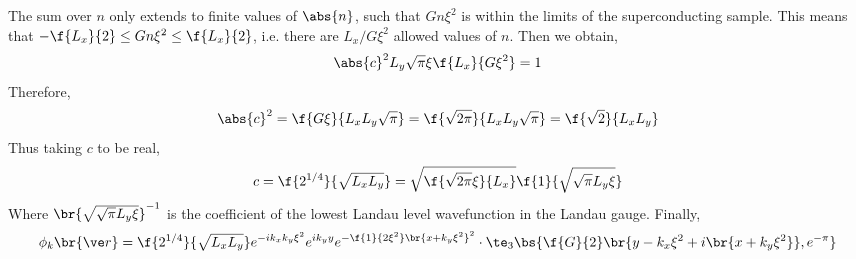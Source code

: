 \documentclass{article}
\begin{document}
The sum over $n$ only extends to finite values of $\abs{n}$, such that $Gn \xi^2$ is within the limits of the superconducting sample. This means that $- \f{L_x}{2} \leq G n \xi^2 \leq \f{L_x}{2}$, i.e. there are $L_x / G \xi^2$ allowed values of $n$. Then we obtain,
\[ \abs{c}^2 L_y \sqrt{\pi} \xi \f{L_x}{G \xi^2} = 1 \]
Therefore,
\[ \abs{c}^2 = \f{G \xi}{L_xL_y \sqrt{\pi}} = \f{\sqrt{2\pi}}{L_xL_y \sqrt{\pi}} = \f{\sqrt{2}}{L_x L_y} \]
Thus taking $c$ to be real,
\[  c = \f{2^{1/4}}{\sqrt{L_xL_y}} = \sqrt{\f{\sqrt{2\pi} \xi}{L_x}} \f{1}{\sqrt{\sqrt{\pi} L_y \xi}} \]
Where $\br{\sqrt{\sqrt{\pi} L_y \xi}}^{-1}$ is the coefficient of the lowest Landau level wavefunction in the Landau gauge. Finally,
\[ \phi_k\br{\ve r} = \f{2^{1/4}}{\sqrt{L_xL_y}} e^{- ik_xk_y \xi^2} e^{i k_y y} e^{-\f{1}{2 \xi^2}\br{x + k_y \xi^2}^2} \cdot \te_3\bs{\f{G}{2}\br{y - k_x \xi^2 + i \br{x + k_y \xi^2}}, e^{-\pi}} \]
\end{document}
